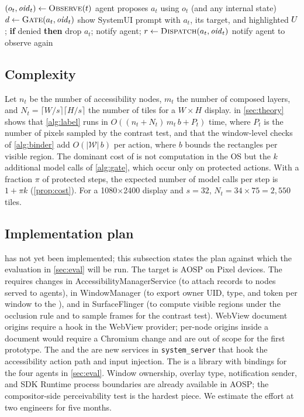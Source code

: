 \begin{algorithm}[t]
\caption{One \PG{} step}\label{alg:step}
\small
\begin{algorithmic}[1]
\State $(o_t,\mathit{oid}_t)\gets\textsc{Observe}(t)$ 
\State agent proposes $a_t$ using $o_t$ (and any internal state) 
\State $d\gets\textsc{Gate}(a_t,\mathit{oid}_t)$ 
  \State show SystemUI prompt with $a_t$, its target, and highlighted $U$; \textbf{if} denied \textbf{then} drop $a_t$; notify agent; \Return
\EndIf
\State $r\gets\textsc{Dispatch}(a_t,\mathit{oid}_t)$ 
 notify agent to observe again \EndIf
\end{algorithmic}
\end{algorithm}

\subsection{Complexity}\label{sec:complexity}

Let $n_t$ be the number of accessibility nodes, $m_t$ the number of composed layers, and $N_t=\lceil W/s\rceil\lceil H/s\rceil$ the number of tiles for a $W\times H$ display.  in \cref{sec:theory} shows that \cref{alg:label} runs in $O((n_t+N_t)\,m_t\,b + P_t)$ time, where $P_t$ is the number of pixels sampled by the contrast test, and that the window-level checks of \cref{alg:binder} add $O(|\mathcal{W}|\,b)$ per action, where $b$ bounds the rectangles per visible region. The dominant cost of \PG{} is not computation in the OS but the $k$ additional model calls of \cref{alg:gate}, which occur only on protected actions. With a fraction $\pi$ of protected steps, the expected number of model calls per step is $1+\pi k$ (\cref{prop:cost}). For a 1080$\times$2400 display and $s=32$, $N_t=34\times75=2{,}550$ tiles.

\subsection{Implementation plan}\label{sec:impl-plan}

\PG{} has not yet been implemented; this subsection states the plan against which the evaluation in \cref{sec:eval} will be run. The target is AOSP on Pixel devices. The \LS{} requires changes in AccessibilityManagerService (to attach records to nodes served to agents), in WindowManager (to export owner UID, type, and token per window to the \LS{}), and in SurfaceFlinger (to compute visible regions under the occlusion rule and to sample frames for the contrast test). WebView document origins require a hook in the WebView provider; per-node origins inside a document would require a Chromium change and are out of scope for the first prototype. The \CG{} and the \DB{} are new services in \texttt{system\_server} that hook the accessibility action path and input injection. The \PA{} is a library with bindings for the four agents in \cref{sec:eval}. Window ownership, overlay type, notification sender, and SDK Runtime process boundaries are already available in AOSP; the compositor-side perceivability test is the hardest piece. We estimate the effort at two engineers for five months.

